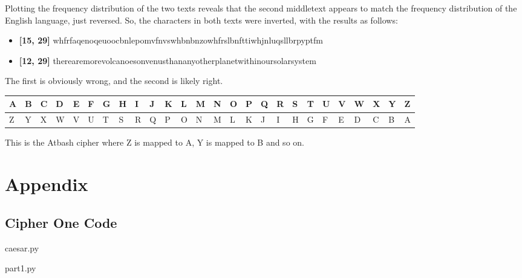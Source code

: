 \documentclass{article}
\begin{document}
Plotting the frequency distribution of the two texts reveals that the second middletext appears to match the frequency distribution of the English language, just reversed. So, the characters in both texts were inverted, with the results as follows:

\begin{itemize}
\item \textbf{[15, 29]} whfrfaqenoqeuoocbnlepomvfnvswhbnbnzowhfrslbnfttiwhjnluqsllbrpyptfm
\item \textbf{[12, 29]} therearemorevolcanoesonvenusthananyotherplanetwithinoursolarsystem
\end{itemize}

The first is obviously wrong, and the second is likely right.

\begin{table}[H]
\centering
\begin{adjustbox}{width=\textwidth}
\begin{tabular}{l|l|l|l|l|l|l|l|l|l|l|l|l|l|l|l|l|l|l|l|l|l|l|l|l|l}
A & B & C & D & E & F & G & H & I & J & K & L & M & N & O & P & Q & R & S & T & U & V & W & X & Y & Z\\
\hline
Z & Y & X & W & V & U & T & S & R & Q & P & O & N & M & L & K & J & I & H & G & F & E & D & C & B & A\\
\end{tabular}
\end{adjustbox}
\end{table}

\vspace{-2.5mm} %

This is the Atbash cipher where Z is mapped to A, Y is mapped to B and so on.

\clearpage

\section{Appendix}

\subsection{Cipher One Code}

caesar.py



part1.py


\end{document}
